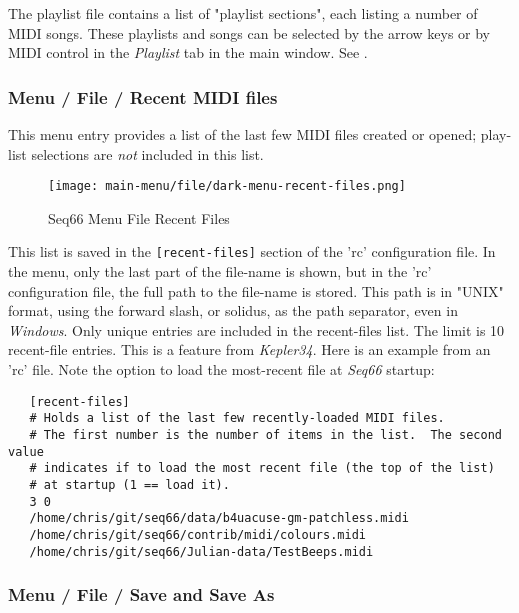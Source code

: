    The playlist file contains a list of "playlist sections",
   each listing a number of MIDI songs.
   These playlists and songs can be
   selected by the arrow keys or by MIDI control in the \textsl{Playlist} tab
   in the main window.
   See .

\subsubsection{Menu / File / Recent MIDI files}
\label{subsubsec:seq66_menu_file_recent}

   This menu entry provides a list of the last few MIDI files created or opened;
   play-list selections are \textsl{not} included in this list.

\begin{figure}[H]
   \centering 
   \texttt{[image: main-menu/file/dark-menu-recent-files.png]}
   \caption{Seq66 Menu File Recent Files}
   \label{fig:seq66_menu_file_recent_files}
\end{figure}

   This list is saved in the \texttt{[recent-files]} section of the
   'rc' configuration file.
   In the menu, only the last part of the file-name is
   shown, but in the 'rc' configuration file,
   the full path to the file-name is stored.
   This path is in "UNIX" format, using the forward slash, or solidus,
   as the path separator, even in \textsl{Windows}.
   Only unique entries are included in the recent-files list.
   The limit is 10 recent-file entries.
   This is a feature from \textsl{Kepler34}.
   Here is an example from an 'rc' file.  Note the option to load the
   most-recent file at \textsl{Seq66} startup:

\begin{verbatim}
   [recent-files]
   # Holds a list of the last few recently-loaded MIDI files.
   # The first number is the number of items in the list.  The second value
   # indicates if to load the most recent file (the top of the list)
   # at startup (1 == load it).
   3 0
   /home/chris/git/seq66/data/b4uacuse-gm-patchless.midi
   /home/chris/git/seq66/contrib/midi/colours.midi
   /home/chris/git/seq66/Julian-data/TestBeeps.midi
\end{verbatim}

\subsubsection{Menu / File / Save and Save As}
\label{subsubsec:menu_file_open_save_as}

